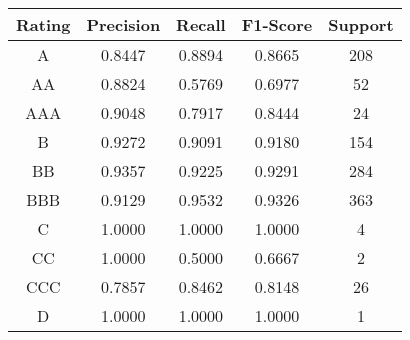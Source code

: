 \footnotesize
\begin{tabular}{ccccc}
\toprule
Rating & Precision & Recall & F1-Score & Support \\
\midrule
A & 0.8447 & 0.8894 & 0.8665 & 208 \\
AA & 0.8824 & 0.5769 & 0.6977 & 52 \\
AAA & 0.9048 & 0.7917 & 0.8444 & 24 \\
B & 0.9272 & 0.9091 & 0.9180 & 154 \\
BB & 0.9357 & 0.9225 & 0.9291 & 284 \\
BBB & 0.9129 & 0.9532 & 0.9326 & 363 \\
C & 1.0000 & 1.0000 & 1.0000 & 4 \\
CC & 1.0000 & 0.5000 & 0.6667 & 2 \\
CCC & 0.7857 & 0.8462 & 0.8148 & 26 \\
D & 1.0000 & 1.0000 & 1.0000 & 1 \\
\bottomrule
\end{tabular}

\normalsize